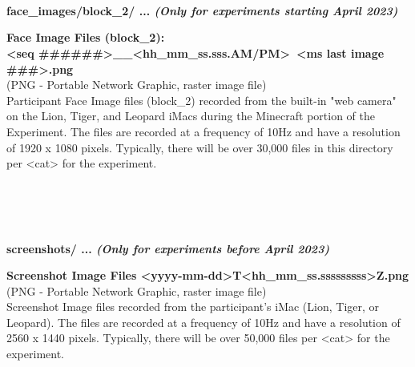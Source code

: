 \begin{description}
\textbf{\\\\\\}
\begin{addmargin}[0em]{0em} %
    \textbf{face\_images/block\_2/ ... \textit{(Only for experiments starting April 2023)}}

    \begin{addmargin}[1em]{0em} %
        \textbf{Face Image Files (block\_2):\\<seq \#\#\#\#\#\#>\_<yyyy-mm-dd>\_<hh\_mm\_ss.sss.AM/PM>~<ms last image \#\#\#>.png}\\
        (PNG - Portable Network Graphic, raster image file)\\
        Participant Face Image files (block\_2) recorded from the built-in "web camera" on the Lion, Tiger,
        and Leopard iMacs during the Minecraft portion of the Experiment.
        The files are recorded at a frequency of 10Hz and have a resolution of 1920 x 1080 pixels.
        Typically, there will be over 30,000 files in this directory per <cat> for the experiment. 
    \end{addmargin} %

\end{addmargin} %


\textbf{\\\\\\}
\begin{addmargin}[0em]{0em} %
    \textbf{screenshots/ ... \textit{(Only for experiments before April 2023)}}

    \begin{addmargin}[1em]{0em} %
        \textbf{Screenshot Image Files <yyyy-mm-dd>T<hh\_mm\_ss.sssssssss>Z.png}\\
        (PNG - Portable Network Graphic, raster image file)\\
        Screenshot Image files recorded from the participant's iMac (Lion, Tiger, or Leopard).
        The files are recorded at a frequency of 10Hz and have a resolution of 2560 x 1440 pixels.
        Typically, there will be over 50,000 files per <cat> for the experiment. 
    \end{addmargin} %

\end{addmargin} %


\end{description}
